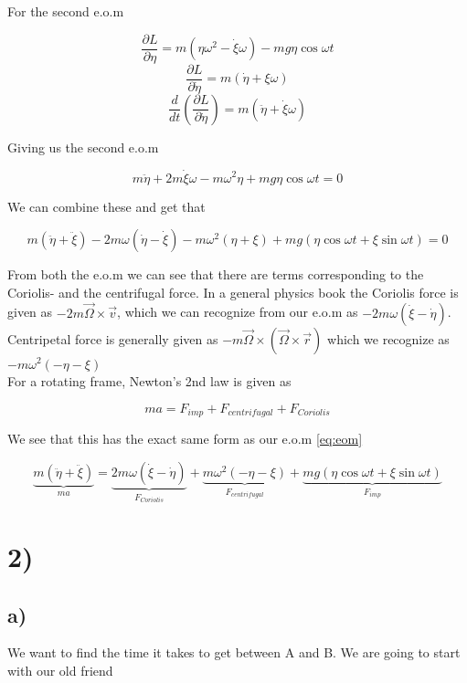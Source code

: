 \documentclass[a4paper,norsk, 10pt]{article}
\begin{document}
For the second e.o.m

$$
\frac{\partial L}{\partial \eta} = m(\eta\omega^2 - \dot{\xi}\omega) - mg\eta \cos\omega t
$$
$$
\frac{\partial L}{\partial \dot{\eta}} = m(\dot{\eta} + \xi\omega)
$$
$$
\frac{d}{dt}\left(\frac{\partial L}{\partial \dot{\eta}}\right) =  m(\ddot{\eta} + \dot{\xi}\omega)
$$

Giving us the second e.o.m

\begin{equation}
m\ddot{\eta} + 2m\dot{\xi}\omega -m\omega^2\eta + mg\eta \cos\omega t = 0
\label{eq:etaeom}
\end{equation}

We can combine these and get that 

\begin{equation}
m(\ddot{\eta} + \ddot{\xi}) - 2m\omega(\dot{\eta} -\dot{\xi}) - m\omega^2(\eta + \xi) + mg(\eta\cos\omega t + \xi\sin\omega t) = 0
\label{eq:eom}
\end{equation}

From both the e.o.m we can see that there are terms corresponding to the Coriolis- and the centrifugal force. In a general physics book the Coriolis force is given as $-2m\vec{\Omega}\times \vec{v}$, which we can recognize from our e.o.m as $- 2m\omega(\dot{\xi} -\dot{\eta}) $.\\

Centripetal force is generally given as $-m\vec{\Omega}\times(\vec{\Omega}\times \vec{r})$ which we recognize as $- m\omega^2(-\eta - \xi)$ \\

For a rotating frame, Newton's 2nd law is given as

$$
ma = F_{imp} + F_{centrifugal} + F_{Coriolis}
$$

We see that this has the exact same form as our e.o.m \ref{eq:eom}

$$
\underbrace{m(\ddot{\eta} + \ddot{\xi})}_{ma} = \underbrace{2m\omega(\dot{\xi} -\dot{\eta})}_{F_{Coriolis}} + \underbrace{m\omega^2(-\eta - \xi)}_{F_{centrifugal}} + \underbrace{mg(\eta\cos\omega t + \xi\sin\omega t)}_{F_{imp}}
$$




\section*{2)}
\subsection*{a)}
We want to find the time it takes to get between A and B. We are going to start with our old friend
\end{document}
